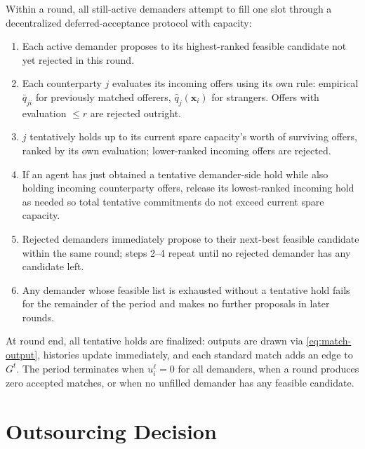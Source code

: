 \documentclass[11pt]{article}
\providecommand{\cref}[1]{\ref{#1}}
\newcommand{\x}{\mathbf{x}}
\newcommand{\qhat}{\hat{q}}
\begin{document}
Within a round, all still-active demanders attempt to fill one slot through a decentralized deferred-acceptance protocol with capacity:
\begin{enumerate}[leftmargin=*,itemsep=2pt]
\item Each active demander proposes to its highest-ranked feasible candidate not yet rejected in this round.
\item Each counterparty $j$ evaluates its incoming offers using its own rule: empirical $\bar q_{ji}$ for previously matched offerers, $\qhat_j(\x_i)$ for strangers. Offers with evaluation $\le r$ are rejected outright.
\item $j$ tentatively holds up to its current spare capacity's worth of surviving offers, ranked by its own evaluation; lower-ranked incoming offers are rejected.
\item If an agent has just obtained a tentative demander-side hold while also holding incoming counterparty offers, release its lowest-ranked incoming hold as needed so total tentative commitments do not exceed current spare capacity.
\item Rejected demanders immediately propose to their next-best feasible candidate within the same round; steps 2--4 repeat until no rejected demander has any candidate left.
\item Any demander whose feasible list is exhausted without a tentative hold fails for the remainder of the period and makes no further proposals in later rounds.
\end{enumerate}

At round end, all tentative holds are finalized: outputs are drawn via \cref{eq:match-output}, histories update immediately, and each standard match adds an edge to $G^t$. The period terminates when $u_i^{\ell}=0$ for all demanders, when a round produces zero accepted matches, or when no unfilled demander has any feasible candidate.

\section{Outsourcing Decision}\label{sec:outsourcing}
\end{document}
